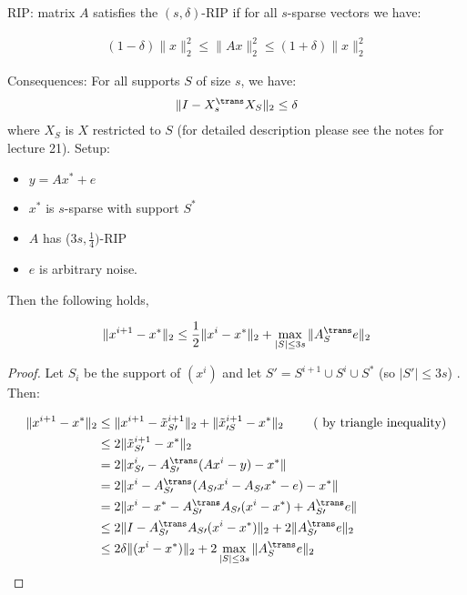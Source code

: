 RIP: matrix $A$ satisfies the $(s,\delta)$-RIP if for all $s$-sparse vectors we have:

\begin{align*}
(1-\delta) \|x\|_2^2 \leq \|Ax\|_2^2 \leq (1+\delta)\|x\|_2^2
\end{align*}

Consequences: For all supports $S$ of size $s$, we have:
\begin{align*}
\|I-X_s^{\trans} X_S\|_2 \leq \delta
\end{align*}
where $X_S$ is $X$ restricted to $S$ (for detailed description please see the notes for lecture 21).
Setup: \\
\begin{itemize}
\item $y = Ax^* + e$ \\
\item $x^*$ is $s$-sparse with support $S^*$ \\ 
\item $A$ has ($3s,\frac{1}{4})$-RIP \\
\item $e$ is arbitrary noise.
\end{itemize}
Then the following holds,
\begin{theorem}
$$\|x^{i+1}-x^*\|_2 \leq \frac{1}{2} \|x^{i}-x^*\|_2 + \max_{|S| \leq 3s} \|A_S^{\trans} e\|_2$$
\end{theorem}

\begin{proof}
Let $S_i$ be the support of  $(x^i)$ and let $ S\prime = S^{i+1} \cup S^i \cup S^*$ (so $|S \prime | \leq 3s$) . Then:

\begin{align*}
\|x^{i+1}-x^*\|_2 &\leq \|x^{i+1} - \tilde x_{S\prime }^{i+1}\|_2 + \|\tilde x_{\prime S}^{i+1} -x^*\|_2\  \tag{ by triangle inequality}\\
			 &\leq 2 \|\tilde x_{ S\prime}^{i+1} -x^*\|_2\\ 
			 &= 2 \|x_{ S\prime}^i - A_ { S\prime}^{\trans}(Ax^i -y)-x^*\|\\
			 &= 2 \|x^i - A_ {S\prime}^{\trans}(A_ { S \prime}x^i -A_ { S\prime}x^*-e)-x^*\|\\
			 &= 2 \|x^i - x^*- A_ { S\prime}^{\trans}A_ { S\prime} (x^i-x^*) + A_ {S \prime}^{\trans} e\|\\
			 &\leq 2\| I -  A_ {S \prime}^{\trans} A_ {S \prime} (x^i-x^*)\|_2 +   2\| A_ {S \prime}^{\trans} e\|_2 \\
			 &\leq 2 \delta \| (x^i-x^*)\|_2 +   2 \max_{|S| \leq 3s}\| A_ {S}^{\trans} e\|_2
\end{align*}
\end{proof}

